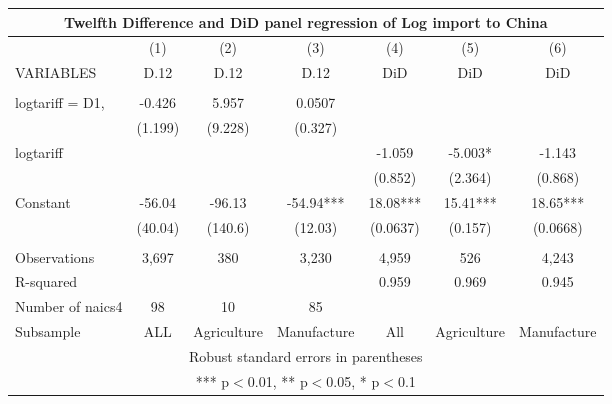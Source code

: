 \begin{tabular}{lcccccc}
\multicolumn{7}{c}{Twelfth Difference and DiD panel regression of Log import to China} \\ \hline
 & (1) & (2) & (3) & (4) & (5) & (6) \\
VARIABLES & D.12 & D.12 & D.12 & DiD & DiD & DiD \\ \hline
 &  &  &  &  &  &  \\
logtariff = D1, & -0.426 & 5.957 & 0.0507 &  &  &  \\
 & (1.199) & (9.228) & (0.327) &  &  &  \\
logtariff &  &  &  & -1.059 & -5.003* & -1.143 \\
 &  &  &  & (0.852) & (2.364) & (0.868) \\
Constant & -56.04 & -96.13 & -54.94*** & 18.08*** & 15.41*** & 18.65*** \\
 & (40.04) & (140.6) & (12.03) & (0.0637) & (0.157) & (0.0668) \\
 &  &  &  &  &  &  \\
Observations & 3,697 & 380 & 3,230 & 4,959 & 526 & 4,243 \\
R-squared &  &  &  & 0.959 & 0.969 & 0.945 \\
Number of naics4 & 98 & 10 & 85 &  &  &  \\
 Subsample & ALL & Agriculture & Manufacture & All & Agriculture & Manufacture \\ \hline
\multicolumn{7}{c}{ Robust standard errors in parentheses} \\
\multicolumn{7}{c}{ *** p$<$0.01, ** p$<$0.05, * p$<$0.1} \\
\end{tabular}
